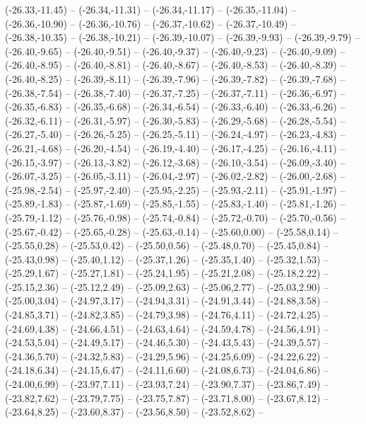 {  (-26.33,-11.45) -- (-26.34,-11.31) -- (-26.34,-11.17) -- (-26.35,-11.04) -- (-26.36,-10.90) -- (-26.36,-10.76) -- (-26.37,-10.62) --
  (-26.37,-10.49) -- (-26.38,-10.35) -- (-26.38,-10.21) -- (-26.39,-10.07) -- (-26.39,-9.93) -- (-26.39,-9.79) -- (-26.40,-9.65) --
  (-26.40,-9.51) -- (-26.40,-9.37) -- (-26.40,-9.23) -- (-26.40,-9.09) -- (-26.40,-8.95) -- (-26.40,-8.81) -- (-26.40,-8.67) --
  (-26.40,-8.53) -- (-26.40,-8.39) -- (-26.40,-8.25) -- (-26.39,-8.11) -- (-26.39,-7.96) -- (-26.39,-7.82) -- (-26.39,-7.68) --
  (-26.38,-7.54) -- (-26.38,-7.40) -- (-26.37,-7.25) -- (-26.37,-7.11) -- (-26.36,-6.97) -- (-26.35,-6.83) -- (-26.35,-6.68) --
  (-26.34,-6.54) -- (-26.33,-6.40) -- (-26.33,-6.26) -- (-26.32,-6.11) -- (-26.31,-5.97) -- (-26.30,-5.83) -- (-26.29,-5.68) --
  (-26.28,-5.54) -- (-26.27,-5.40) -- (-26.26,-5.25) -- (-26.25,-5.11) -- (-26.24,-4.97) -- (-26.23,-4.83) -- (-26.21,-4.68) --
  (-26.20,-4.54) -- (-26.19,-4.40) -- (-26.17,-4.25) -- (-26.16,-4.11) -- (-26.15,-3.97) -- (-26.13,-3.82) -- (-26.12,-3.68) --
  (-26.10,-3.54) -- (-26.09,-3.40) -- (-26.07,-3.25) -- (-26.05,-3.11) -- (-26.04,-2.97) -- (-26.02,-2.82) -- (-26.00,-2.68) --
  (-25.98,-2.54) -- (-25.97,-2.40) -- (-25.95,-2.25) -- (-25.93,-2.11) -- (-25.91,-1.97) -- (-25.89,-1.83) -- (-25.87,-1.69) --
  (-25.85,-1.55) -- (-25.83,-1.40) -- (-25.81,-1.26) -- (-25.79,-1.12) -- (-25.76,-0.98) -- (-25.74,-0.84) -- (-25.72,-0.70) --
  (-25.70,-0.56) -- (-25.67,-0.42) -- (-25.65,-0.28) -- (-25.63,-0.14) -- (-25.60,0.00) -- (-25.58,0.14) -- (-25.55,0.28) --
  (-25.53,0.42) -- (-25.50,0.56) -- (-25.48,0.70) -- (-25.45,0.84) -- (-25.43,0.98) -- (-25.40,1.12) -- (-25.37,1.26) --
  (-25.35,1.40) -- (-25.32,1.53) -- (-25.29,1.67) -- (-25.27,1.81) -- (-25.24,1.95) -- (-25.21,2.08) -- (-25.18,2.22) --
  (-25.15,2.36) -- (-25.12,2.49) -- (-25.09,2.63) -- (-25.06,2.77) -- (-25.03,2.90) -- (-25.00,3.04) -- (-24.97,3.17) --
  (-24.94,3.31) -- (-24.91,3.44) -- (-24.88,3.58) -- (-24.85,3.71) -- (-24.82,3.85) -- (-24.79,3.98) -- (-24.76,4.11) --
  (-24.72,4.25) -- (-24.69,4.38) -- (-24.66,4.51) -- (-24.63,4.64) -- (-24.59,4.78) -- (-24.56,4.91) -- (-24.53,5.04) --
  (-24.49,5.17) -- (-24.46,5.30) -- (-24.43,5.43) -- (-24.39,5.57) -- (-24.36,5.70) -- (-24.32,5.83) -- (-24.29,5.96) --
  (-24.25,6.09) -- (-24.22,6.22) -- (-24.18,6.34) -- (-24.15,6.47) -- (-24.11,6.60) -- (-24.08,6.73) -- (-24.04,6.86) --
  (-24.00,6.99) -- (-23.97,7.11) -- (-23.93,7.24) -- (-23.90,7.37) -- (-23.86,7.49) -- (-23.82,7.62) -- (-23.79,7.75) --
  (-23.75,7.87) -- (-23.71,8.00) -- (-23.67,8.12) -- (-23.64,8.25) -- (-23.60,8.37) -- (-23.56,8.50) -- (-23.52,8.62) --
}
